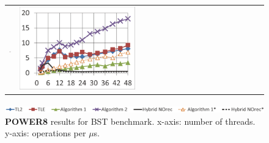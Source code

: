 \begin{figure}
\begin{minipage}{1\linewidth}
\begin{tabular}{m{0.04\linewidth}m{0.48\linewidth}m{0.48\linewidth}}
        \vspace{-8mm}\includegraphics[width=\linewidth]{figures/graphs/power8/20i20d10000k-nrq0.png} &
        \vspace{-8mm}\includegraphics[width=\linewidth]{figures/graphs/power8/20i20d10000k-nrq1.png}
        \\
    \end{tabular}
\end{minipage}
    \vspace{-2mm}
	\includegraphics[width=\linewidth]{figures/graphs/power8/dsbench3_legend_power.png}
    \vspace{-2mm}
\caption{\textbf{POWER8} results for BST benchmark. x-axis: number of threads. y-axis: operations per $\mu$s.}
\label{fig-exp-power8}
\end{figure}

